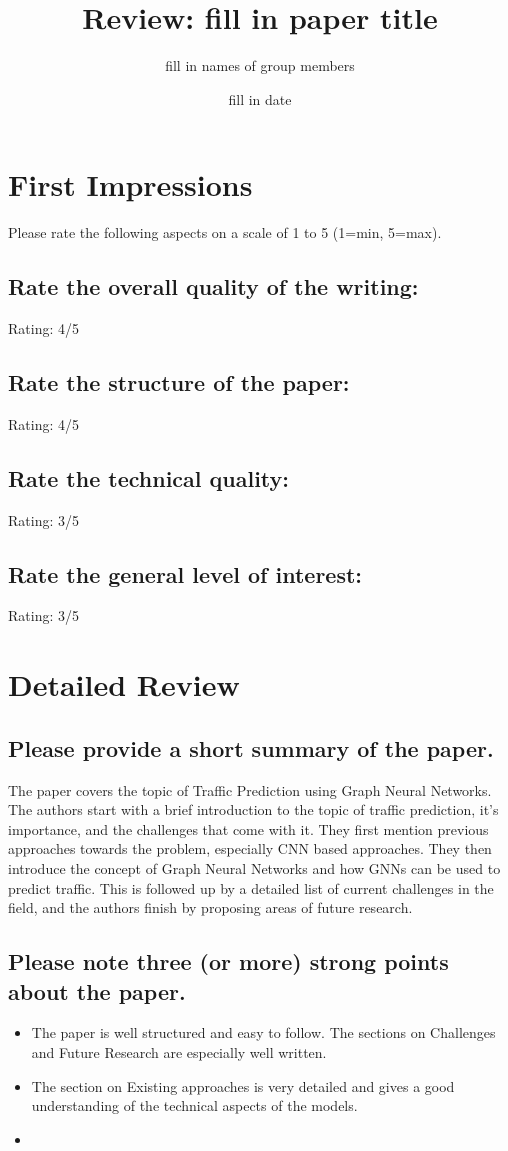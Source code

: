 \documentclass[12pt]{article}
\title{Review: fill in paper title}
\author{fill in names of group members}
\date{fill in date}
\begin{document}
\maketitle

\section{First Impressions}
Please rate the following aspects on a scale of 1 to 5 (1=min, 5=max).

\subsection*{Rate the overall quality of the writing:}
Rating: 4/5


\subsection*{Rate the structure of the paper:}
Rating: 4/5

\subsection*{Rate the technical quality:}
Rating: 3/5

\subsection*{Rate the general level of interest:}
Rating: 3/5


\section{Detailed Review}
\subsection*{Please provide a short summary of the paper.}
The paper covers the topic of Traffic Prediction using Graph Neural Networks. The authors start with a brief introduction to the topic 
of traffic prediction, it's importance, and the challenges that come with it. They first mention previous approaches towards the problem,
especially CNN based approaches. They then introduce the concept of Graph Neural Networks and how GNNs can be used to 
predict traffic. This is followed up by a detailed list of current challenges in the field, and the authors finish by proposing areas of future
research.

\subsection*{Please note three (or more) strong points about the paper.}
\begin{itemize}
    \item The paper is well structured and easy to follow. The sections on Challenges and Future Research are especially well written.
    \item The section on Existing approaches is very detailed and gives a good understanding of the technical aspects of the models.
    \item 
\end{itemize}
\end{document}
